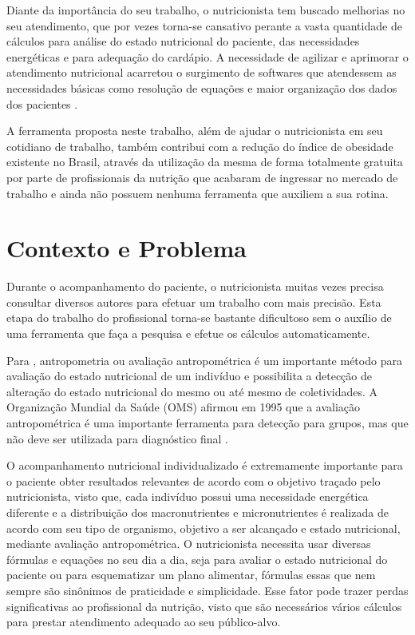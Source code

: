 \documentclass[
	12pt,				%
    oneside,			%
	a4paper,			%
	english,			%
	french,				%
	spanish,			%
	brazil,				%
	]{abntex2}
\begin{document}
Diante da importância do seu trabalho, o nutricionista tem buscado melhorias
no seu atendimento, que por vezes torna-se cansativo perante a vasta quantidade de
cálculos para análise do estado nutricional do paciente, das necessidades energéticas
e para adequação do cardápio. A necessidade de agilizar e aprimorar o atendimento
nutricional acarretou o surgimento de softwares que atendessem as necessidades
básicas como resolução de equações e maior organização dos dados dos pacientes
\cite{vieira}.

A ferramenta proposta neste trabalho, além de ajudar o nutricionista em seu cotidiano de trabalho,
também contribui com a redução do índice de obesidade existente no Brasil, através da utilização da mesma
de forma totalmente gratuita por parte de profissionais da nutrição que acabaram de ingressar no mercado
de trabalho e ainda não possuem nenhuma ferramenta que auxiliem a sua rotina.


\section{Contexto e Problema}

Durante o acompanhamento do paciente, o nutricionista muitas vezes precisa
consultar diversos autores para efetuar um trabalho com mais precisão. Esta etapa do trabalho do profissional
torna-se bastante dificultoso sem o auxílio de uma ferramenta que faça a pesquisa e efetue os cálculos automaticamente.

Para , antropometria ou avaliação antropométrica é um importante método para avaliação do estado nutricional de um indivíduo e possibilita a detecção de alteração do estado nutricional do mesmo ou até mesmo de coletividades. A Organização Mundial da Saúde (OMS) afirmou em 1995 que a avaliação antropométrica é uma importante ferramenta para detecção para grupos, mas que não deve ser utilizada para diagnóstico final \cite{oms}.

O acompanhamento nutricional individualizado é extremamente importante para
o paciente obter resultados relevantes de acordo com o objetivo traçado pelo
nutricionista, visto que, cada indivíduo possui uma necessidade energética diferente
e a distribuição dos macronutrientes e micronutrientes é realizada de acordo com seu
tipo de organismo, objetivo a ser alcançado e estado nutricional, mediante avaliação
antropométrica.
O nutricionista necessita usar diversas fórmulas
e equações no seu dia a dia, seja para avaliar o estado nutricional do
paciente ou para esquematizar um plano alimentar, fórmulas essas que nem sempre
são sinônimos de praticidade e simplicidade. Esse fator pode trazer perdas
significativas ao profissional da nutrição, visto que são necessários vários cálculos
para prestar atendimento adequado ao seu público-alvo.
\end{document}

